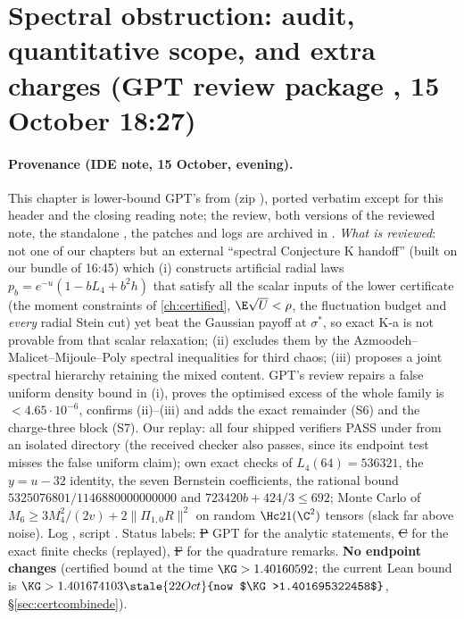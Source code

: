 \section{Spectral obstruction: audit, quantitative scope, and extra charges (GPT review package , 15 October 18:27)}
\label{ch:spectral-review}

\paragraph{Provenance (IDE note, 15 October, evening).} This chapter is lower-bound GPT's  from
 (zip ), ported verbatim except for this header and the closing
reading note; the review, both versions of the reviewed note, the standalone , the patches and logs are archived in
. \emph{What is reviewed}: not one of our chapters but an external ``spectral Conjecture K handoff'' (built on our
bundle of 16:45) which (i) constructs artificial radial laws $p_b=e^{-u}(1-bL_4+b^2h)$ that satisfy all the scalar inputs of the lower certificate (the moment constraints of
\autoref{ch:certified}, $\E\sqrt U<\rho$, the fluctuation budget and \emph{every} radial Stein cut) yet beat the Gaussian payoff at $\sigma^*$, so exact K-a is not provable from that scalar
relaxation; (ii) excludes them by the Azmoodeh--Malicet--Mijoule--Poly spectral inequalities for third chaos; (iii) proposes a joint spectral hierarchy retaining the mixed content.
GPT's review repairs a false uniform density bound in (i), proves the optimised excess of the whole family is $<4.65\cdot10^{-6}$, confirms (ii)--(iii) and adds the exact remainder (S6)
and the charge-three block (S7). Our replay: all four shipped verifiers PASS under  from an isolated directory (the received checker also passes, since its endpoint test
misses the false uniform claim); own exact checks of $L_4(64)=536321$, the $y=u-32$ identity, the seven Bernstein coefficients, the rational bound $5325076801/1146880000000000$ and
$723420b+424/3\le692$; Monte Carlo of $M_6\ge3M_4^2/(2v)+2\|\Pi_{1,0}R\|^2$ on random $\Hc21(\C^2)$ tensors (slack far above noise). Log ,
script . Status labels: \st{P} GPT for the analytic statements, \st{C} for the exact finite checks (replayed), \st{F} for the quadrature remarks.
\textbf{No endpoint changes} (certified bound at the time $\KG>1.40160592$; the current Lean bound is $\KG>1.401674103\stale{22 Oct}{now $\KG>1.401695322458$}$, \S\ref{sec:certcombinede}).

